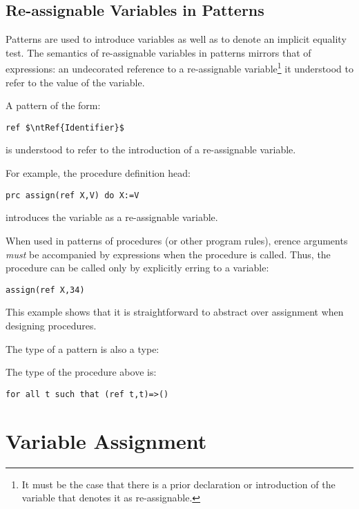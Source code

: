 \subsection{Re-assignable Variables in Patterns}
\label{reVarInPattern}
Patterns are used to introduce variables as well as to denote an implicit equality test. The semantics of re-assignable variables in patterns mirrors that of expressions: an undecorated reference to a re-assignable variable\footnote{It must be the case that there is a prior declaration or introduction of the variable that denotes it as re-assignable.} it understood to refer to the value of the variable.

A pattern of the form:
\begin{lstlisting}[mathescape=true]
ref $\ntRef{Identifier}$
\end{lstlisting}
is understood to refer to the introduction of a re-assignable variable.

For example, the procedure definition head:
\begin{lstlisting}
prc assign(ref X,V) do X:=V
\end{lstlisting}
introduces the variable  as a re-assignable variable. 
\begin{aside}
When used in patterns of procedures (or other program rules), erence arguments \emph{must} be accompanied by  expressions when the procedure is called. Thus, the  procedure can be called only by explicitly erring to a variable:
\begin{lstlisting}
assign(ref X,34)
\end{lstlisting}
\begin{aside}
This example shows that it is straightforward to abstract over assignment when designing procedures.
\end{aside}
\end{aside}
The type of a  pattern is also a  type:
\begin{prooftree}
\end{prooftree}
\begin{aside}
The type of the  procedure above is:
\begin{lstlisting}
for all t such that (ref t,t)=>()
\end{lstlisting}
\end{aside}

\section{Variable Assignment}
\label{variableAssignment}

